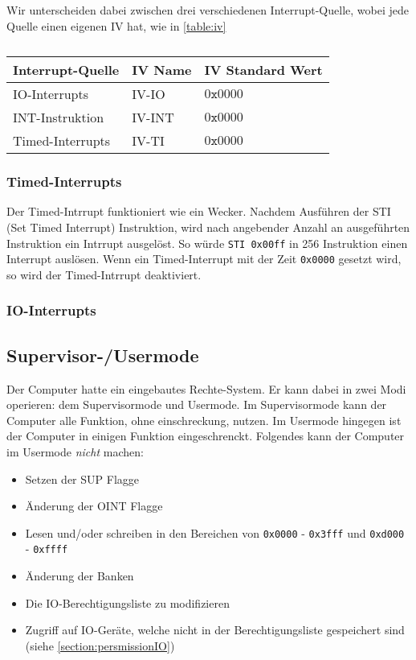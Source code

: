 \documentclass{scrartcl}
\begin{document}
Wir unterscheiden dabei zwischen drei verschiedenen Interrupt-Quelle, wobei jede Quelle einen eigenen IV hat, wie in \autoref{table:iv}

\begin{center}	
	\begin{table}[h]
		\caption{\label{table:iv}}
		\begin{tabular}{l | l l}
			Interrupt-Quelle & IV Name & IV Standard Wert \\
			\hline
			IO-Interrupts & IV-IO & $0\texttt{x}0000$ \\
			INT-Instruktion & IV-INT & $0\texttt{x}0000$ \\
			Timed-Interrupts & IV-TI & $0\texttt{x}0000$ \\
		\end{tabular}
	\end{table}
\end{center}

\subsubsection{Timed-Interrupts}

Der Timed-Intrrupt funktioniert wie ein Wecker. Nachdem Ausführen der STI (Set Timed Interrupt) Instruktion, wird nach angebender Anzahl an ausgeführten Instruktion ein Intrrupt ausgelöst. So 
würde \texttt{STI 0x00ff} in 256 Instruktion einen Interrupt auslösen. Wenn ein Timed-Interrupt mit der Zeit \texttt{0x0000} gesetzt wird, so wird der Timed-Intrrupt deaktiviert.

\subsubsection{IO-Interrupts}

\subsection{\label{section:supervisor}Supervisor-/Usermode}

Der Computer hatte ein eingebautes Rechte-System. Er kann dabei in zwei Modi operieren: dem Supervisormode und Usermode. Im Supervisormode kann der Computer alle Funktion, ohne einschreckung, nutzen. Im Usermode hingegen ist der Computer in einigen Funktion eingeschrenckt. Folgendes kann der Computer im Usermode \emph{nicht} machen:

\begin{itemize}
	\item Setzen der SUP Flagge
	\item Änderung der OINT Flagge
	\item Lesen und/oder schreiben in den Bereichen von \texttt{0x0000} - \texttt{0x3fff} und \texttt{0xd000} - \texttt{0xffff}
	\item Änderung der Banken
	\item Die IO-Berechtigungsliste zu modifizieren
	\item Zugriff auf IO-Geräte, welche nicht in der Berechtigungsliste gespeichert sind (siehe \autoref{section:persmissionIO})
\end{itemize}
\end{document}
